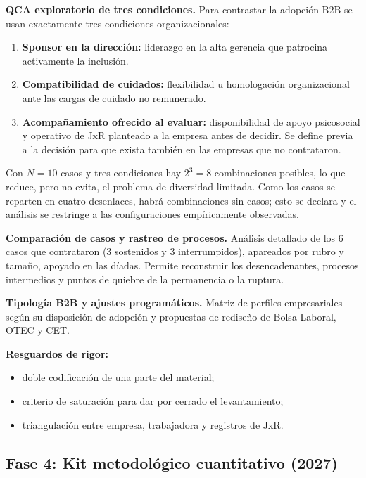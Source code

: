 \textbf{QCA exploratorio de tres condiciones.} Para contrastar la adopción B2B se usan exactamente tres condiciones organizacionales:

\begin{enumerate}
    \item \textbf{Sponsor en la dirección:} liderazgo en la alta gerencia que patrocina activamente la inclusión.
    \item \textbf{Compatibilidad de cuidados:} flexibilidad u homologación organizacional ante las cargas de cuidado no remunerado.
    \item \textbf{Acompañamiento ofrecido al evaluar:} disponibilidad de apoyo psicosocial y operativo de JxR planteado a la empresa antes de decidir. Se define previa a la decisión para que exista también en las empresas que no contrataron.
\end{enumerate}

Con $N = 10$ casos y tres condiciones hay $2^3 = 8$ combinaciones posibles, lo que reduce, pero no evita, el problema de diversidad limitada. Como los casos se reparten en cuatro desenlaces, habrá combinaciones sin casos; esto se declara y el análisis se restringe a las configuraciones empíricamente observadas.

\textbf{Comparación de casos y rastreo de procesos.} Análisis detallado de los 6 casos que contrataron (3 sostenidos y 3 interrumpidos), apareados por rubro y tamaño, apoyado en las díadas. Permite reconstruir los desencadenantes, procesos intermedios y puntos de quiebre de la permanencia o la ruptura.

\textbf{Tipología B2B y ajustes programáticos.} Matriz de perfiles empresariales según su disposición de adopción y propuestas de rediseño de Bolsa Laboral, OTEC y CET.

\textbf{Resguardos de rigor:}

\begin{itemize}
    \item doble codificación de una parte del material;
    \item criterio de saturación para dar por cerrado el levantamiento;
    \item triangulación entre empresa, trabajadora y registros de JxR.
\end{itemize}

\subsection{Fase 4: Kit metodológico cuantitativo (2027)}

